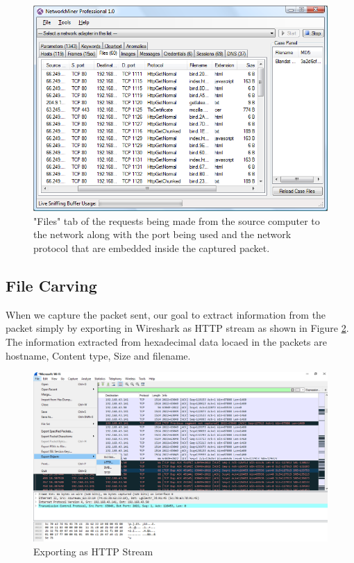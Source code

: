 \documentclass{article}
\begin{document}
\begin{figure}[H]
	\begin{center}
		\includegraphics[width=0.6
\textwidth]{FINDINGANN2.png}
	\end{center}
	\caption{"Files" tab of the requests being made from the source computer to the network along with the port being used and the network protocol that are embedded inside the captured packet.}
	\label{fig:Prd}
\end{figure}

\subsection{File Carving}
When we capture the packet sent, our goal to extract information from the packet simply by exporting in Wireshark as HTTP stream as shown in Figure \ref{fig:carv1}. The information extracted from hexadecimal data locaed in the packets are hostname, Content type, Size and filename. 
\begin{figure}[H]
	\begin{center}
		\includegraphics[width=0.6
\textwidth]{FILECARVING1.png}
	\end{center}
	\caption{Exporting as HTTP Stream}
	\label{fig:carv1}
\end{figure}
\end{document}

